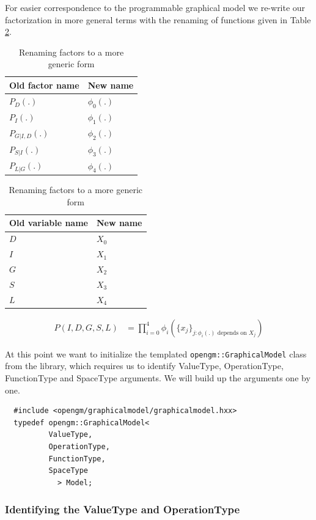 \documentclass[12pt,oneside,letterpaper]{article}
\begin{document}
For easier correspondence to the programmable graphical model we re-write our 
factorization in more general terms with the renaming of functions given in Table \ref{tab:rename}.
\begin{table}
  \centering
  \begin{tabular}{|l|l|}
    \hline
    Old factor name & New name \\
    \hline
          $P_D(.)$  & $\phi_0(.)$\\
          $P_I(.)$  & $\phi_1(.)$\\
    $P_{G|I,D}(.)$  & $\phi_2(.)$\\
      $P_{S|I}(.)$  & $\phi_3(.)$\\
      $P_{L|G}(.)$  & $\phi_4(.)$\\
    \hline
  \end{tabular}
  \begin{tabular}{|l|l|}
    \hline
    Old variable name & New name \\
    \hline
                  $D$ & $X_0$\\
                  $I$ & $X_1$\\
                  $G$ & $X_2$\\
                  $S$ & $X_3$\\
                  $L$ & $X_4$ \\
    \hline
  \end{tabular}
  \caption{Renaming factors to a more generic form}
  \label{tab:rename}
\end{table}

\begin{align}
  P(I, D, G, S, L) &= \prod_{i=0}^{4} \phi_i(\{ x_j \}_{j : \phi_i(.) \text{ depends on } X_j})
  \label{eq:factorization}
\end{align}

At this point we want to initialize the templated
\lstinline|opengm::GraphicalModel| class from the library, which requires us to
identify ValueType, OperationType, FunctionType and SpaceType arguments. We
will build up the arguments one by one.

\begin{lstlisting}
  #include <opengm/graphicalmodel/graphicalmodel.hxx>
  typedef opengm::GraphicalModel<
          ValueType,
          OperationType,
          FunctionType,
          SpaceType
            > Model;
\end{lstlisting}

\subsubsection{Identifying the ValueType and OperationType}
\end{document}
